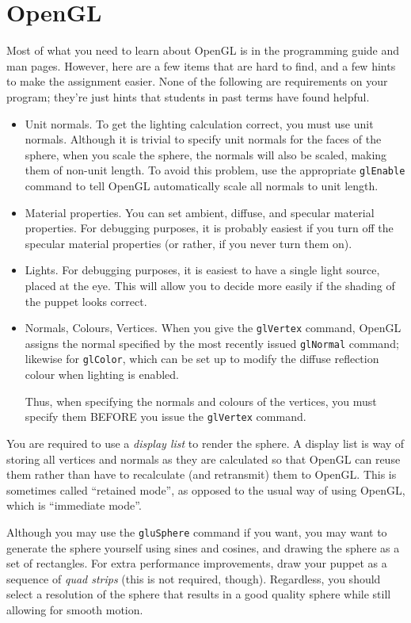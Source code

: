 \section{OpenGL}
Most of what you need to learn about OpenGL is in the programming
guide and man pages.  However, here are a few items that are
hard to find, and a few hints to make the assignment easier.
None of the following are requirements on your program; they're
just hints that students in past terms have found helpful.
\begin{itemize}
	\item Unit normals.  To get the lighting calculation
		correct, you must use unit normals.  Although
		it is trivial to specify unit normals for the
		faces of the sphere, when you scale the sphere,
		the normals will also be scaled, making them
		of non-unit length.  To avoid this problem,
		use the appropriate {\tt glEnable} command to tell OpenGL
		automatically scale all normals to unit length.
	\item Material properties.  You can set ambient, diffuse,
		and specular material properties.  For debugging
		purposes, it is probably easiest if you turn off
		the specular material properties (or rather, if
		you never turn them on).
	\item Lights.  For debugging purposes, it is easiest to
		have a single light source, placed at the eye.
		This will allow you to decide more easily if
		the shading of the puppet looks correct.
	\item Normals, Colours, Vertices.  
		When you give the {\tt glVertex} command,
		OpenGL assigns the normal specified by the
		most recently issued {\tt glNormal} command;
                likewise for {\tt glColor}, which can be set up
                to modify the diffuse reflection colour when
                lighting is enabled.

		Thus, when specifying the
		normals and colours of the vertices, you must
		specify them BEFORE you issue the {\tt glVertex}
		command.  
\end{itemize}

You are required to use a {\em display list} to render the sphere.
A display list is  way of storing all vertices and normals as they
are calculated so that OpenGL can reuse them rather than have to
recalculate (and retransmit) them to OpenGL.   This is sometimes
called ``retained mode'', as opposed to the usual way of using
OpenGL, which is ``immediate mode''.

Although you may use the {\tt gluSphere} command if you want, you may
want to generate the sphere yourself using sines and
cosines, and drawing the sphere as a set of rectangles.  For extra
performance improvements, draw your puppet as a sequence of {\em quad
strips} (this is not required, though).  Regardless, you should select
a resolution of the sphere that results in a good quality sphere while
still allowing for smooth motion.

